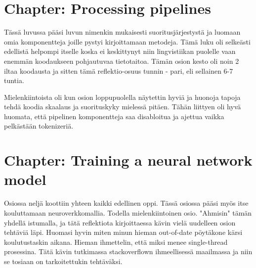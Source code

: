 \documentclass{article}
\begin{document}
\section{Chapter: Processing pipelines} 

Tässä luvussa pääsi luvun nimenkin mukaisesti suoritusjärjestystä ja luomaan omia komponentteja joille pystyi kirjoittamaan metodeja.
Tämä luku oli selkeästi edellistä helpompi itselle koska ei keskittynyt niin lingvistiikan puolelle vaan enemmän koodaukseen pohjautuvaa tietotaitoa. Tämän osion kesto oli noin 2 iltaa koodausta ja sitten tämä reflektio-osuus tunnin - pari, eli sellainen 6-7 tuntia.

Mielenkiintoista oli kun osion loppupuolella näytettin hyviä ja huonoja tapoja tehdä koodia skaalaus ja suorituskyky mielessä pitäen. Tähän liittyen oli hyvä huomata, että pipelinen komponentteja saa disabloitua ja ajettua vaikka pelkästään tokenizeriä.


\section{Chapter: Training a neural network model}

Osiossa neljä koottiin yhteen kaikki edellinen oppi. Tässä osiossa pääsi myös itse kouluttamaan neuroverkkomallia. Todella mielenkiintoinen osio. "Ahmisin" tämän yhdellä istumalla, ja tätä reflektiota kirjoittaessa kävin vielä uudelleen osion tehtäviä läpi. Huomasi hyvin miten minun hieman out-of-date pöytäkone kärsi koulutustaskin aikana. Hieman ihmettelin, että miksi menee single-thread prosessina. Tätä kävin tutkimassa stackoverflown ihmeellisessä maailmassa ja niin se tosiaan on tarkoitettukin tehtäväksi.
\end{document}
